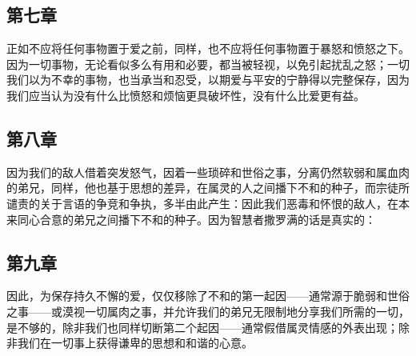 
\subsection{第七章}

\par

正如不应将任何事物置于爱之前，同样，也不应将任何事物置于暴怒和愤怒之下。因为一切事物，无论看似多么有用和必要，都当被轻视，以免引起扰乱之怒；一切我们以为不幸的事物，也当承当和忍受，以期爱与平安的宁静得以完整保存，因为我们应当认为没有什么比愤怒和烦恼更具破坏性，没有什么比爱更有益。\par


\subsection{第八章}

\par

因为我们的敌人借着突发怒气，因着一些琐碎和世俗之事，分离仍然软弱和属血肉的弟兄，同样，他也基于思想的差异，在属灵的人之间播下不和的种子，而宗徒所谴责的关于言语的争竞和争执，多半由此产生：因此我们恶毒和怀恨的敌人，在本来同心合意的弟兄之间播下不和的种子。因为智慧者撒罗满的话是真实的：\par


\subsection{第九章}

\par

因此，为保存持久不懈的爱，仅仅移除了不和的第一起因——通常源于脆弱和世俗之事——或漠视一切属肉之事，并允许我们的弟兄无限制地分享我们所需的一切，是不够的，除非我们也同样切断第二个起因——通常假借属灵情感的外表出现；除非我们在一切事上获得谦卑的思想和和谐的心意。\par


